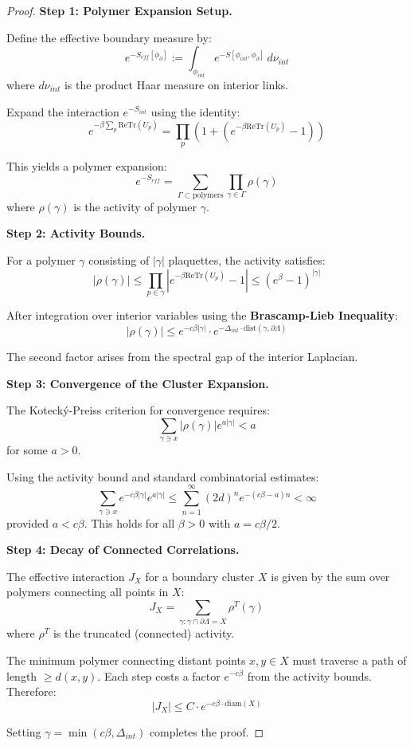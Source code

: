\begin{proof}
\textbf{Step 1: Polymer Expansion Setup.}

Define the effective boundary measure by:
\[
e^{-S_{eff}[\phi_{\partial}]} := \int_{\phi_{int}} e^{-S[\phi_{int}, \phi_{\partial}]} \, d\nu_{int}
\]
where $d\nu_{int}$ is the product Haar measure on interior links.

Expand the interaction $e^{-S_{int}}$ using the identity:
\[
e^{-\beta \sum_p \mathrm{Re}\mathrm{Tr}(U_p)} = \prod_p \left( 1 + (e^{-\beta \mathrm{Re}\mathrm{Tr}(U_p)} - 1) \right)
\]

This yields a polymer expansion:
\[
e^{-S_{eff}} = \sum_{\Gamma \subset \text{polymers}} \prod_{\gamma \in \Gamma} \rho(\gamma)
\]
where $\rho(\gamma)$ is the activity of polymer $\gamma$.

\textbf{Step 2: Activity Bounds.}

For a polymer $\gamma$ consisting of $|\gamma|$ plaquettes, the activity satisfies:
\[
|\rho(\gamma)| \leq \prod_{p \in \gamma} |e^{-\beta \mathrm{Re}\mathrm{Tr}(U_p)} - 1| \leq (e^\beta - 1)^{|\gamma|}
\]

After integration over interior variables using the \textbf{Brascamp-Lieb Inequality}:
\[
|\rho(\gamma)| \leq e^{-c \beta |\gamma|} \cdot e^{-\Delta_{int} \cdot \mathrm{dist}(\gamma, \partial \Lambda)}
\]

The second factor arises from the spectral gap of the interior Laplacian.

\textbf{Step 3: Convergence of the Cluster Expansion.}

The Kotecký-Preiss criterion for convergence requires:
\[
\sum_{\gamma \ni x} |\rho(\gamma)| e^{a|\gamma|} < a
\]
for some $a > 0$.

Using the activity bound and standard combinatorial estimates:
\[
\sum_{\gamma \ni x} e^{-c\beta|\gamma|} e^{a|\gamma|} \leq \sum_{n=1}^\infty (2d)^n e^{-(c\beta - a)n} < \infty
\]
provided $a < c\beta$. This holds for all $\beta > 0$ with $a = c\beta/2$.

\textbf{Step 4: Decay of Connected Correlations.}

The effective interaction $J_X$ for a boundary cluster $X$ is given by the sum over polymers connecting all points in $X$:
\[
J_X = \sum_{\gamma: \gamma \cap \partial \Lambda = X} \rho^T(\gamma)
\]
where $\rho^T$ is the truncated (connected) activity.

The minimum polymer connecting distant points $x, y \in X$ must traverse a path of length $\geq d(x,y)$. Each step costs a factor $e^{-c\beta}$ from the activity bounds. Therefore:
\[
|J_X| \leq C \cdot e^{-c\beta \cdot \mathrm{diam}(X)}
\]

Setting $\gamma = \min(c\beta, \Delta_{int})$ completes the proof.
\end{proof}

